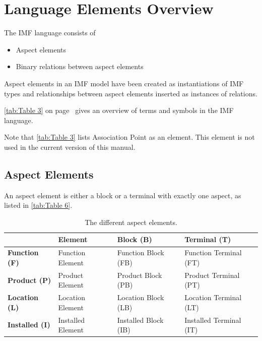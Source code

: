 \documentclass[../main.tex]{subfiles}
\begin{document}
\section{Language Elements Overview}

The IMF language consists of 
\begin{itemize}
    \item Aspect elements
    \item Binary relations between aspect elements
\end{itemize}
Aspect elements in an IMF model have been created as instantiations of IMF types and relationships between aspect elements inserted as instances of relations. 

\autoref{tab:Table 3} on page~\pageref{tab:Table 3} gives an overview of terms and symbols in the IMF language.

Note that \autoref{tab:Table 3}  lists  Association Point as an element. This element is not used in the current version of this manual. 

\subsection{Aspect Elements}
An aspect element is either a block or a terminal with exactly one aspect, as
listed in \autoref{tab:Table 6}.

\begin{table}[htb]\centering\caption{The different aspect elements.}\label{tab:Table 6}
  \centering
  \begin{tabularx}{\textwidth}{XXXX}
    \toprule
    &
    {\bfseries Element} &
    {\bfseries Block (B)} &
    {\bfseries Terminal (T)}\\
    \midrule
    {\bfseries Function (F)} &
    Function Element &
    Function Block (FB) &
    Function Terminal (FT)\\
    {\bfseries Product (P)} &
    Product Element &
    Product Block (PB) &
    Product Terminal (PT)\\
    {\bfseries Location (L)} &
    Location Element  &
    Location Block (LB) &
    Location Terminal (LT)\\
    {\bfseries Installed (I)} &
    Installed Element &
    Installed Block (IB) &
    Installed Terminal (IT)\\
    \bottomrule
  \end{tabularx}
\end{table}

\end{document}
